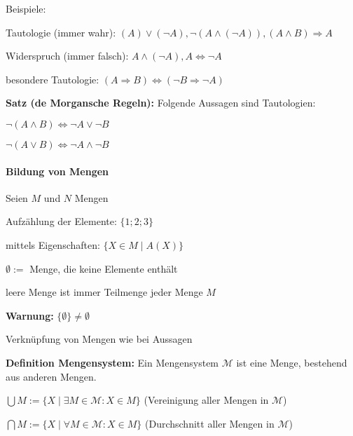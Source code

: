 \documentclass[11pt]{article}
\begin{document}
		Beispiele:
		\begin{compactitem}
			\item Tautologie (immer wahr): 
			$(A) \lor (\lnot A), \lnot (A  \land (\lnot A)), (A \land B) \Rightarrow A$
			\item Widerspruch (immer falsch): $A \land (\lnot A), A \iff \lnot A$  
			\item besondere Tautologie: $(A \Rightarrow B) \iff (\lnot B \Rightarrow \lnot A)$
		\end{compactitem}

		\begin{framed}
			\textbf{Satz (de Morgansche Regeln):} Folgende Aussagen sind Tautologien:
			\begin{compactitem}
				\item $\lnot(A \land B) \iff \lnot A \lor \lnot B$ 
				\item $\lnot(A \lor B) \iff \lnot A \land \lnot B$ 
			\end{compactitem}
		\end{framed}

		\paragraph{Bildung von Mengen}
		Seien $M$ und $N$ Mengen
		\begin{compactitem}
			\item Aufz\"ahlung der Elemente: $\{1;2;3\}$
			\item mittels Eigenschaften: $\{X \in M \mid A(X)\}$
			\item $\emptyset:=$ Menge, die keine Elemente enth\"alt
			\begin{compactitem}
				\item leere Menge ist immer Teilmenge jeder Menge $M$
				\item \textbf{Warnung:} $\{\emptyset\} \neq \emptyset$
			\end{compactitem}
			\item Verkn\"upfung von Mengen wie bei Aussagen
		\end{compactitem}

		\begin{framed}
			\textbf{Definition Mengensystem:} Ein Mengensystem $\mathcal M$ ist eine Menge, bestehend aus 				anderen Mengen.
			\begin{compactitem}
			\item $\bigcup M := \{X \mid \exists M \in \mathcal M: X \in M\}$ (Vereinigung aller Mengen in 
			$\mathcal M$)
			\item $\bigcap M := \{X \mid \forall M \in \mathcal M: X \in M\}$ (Durchschnitt aller Mengen in 
			$\mathcal M$)
			\end{compactitem}
		\end{framed}
\end{document}
